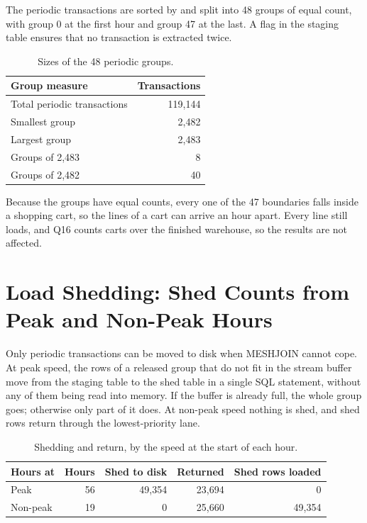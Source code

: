 \documentclass[11pt,a4paper]{article}
\newcommand{\code}[1]{\texttt{\detokenize{#1}}}
\begin{document}
The periodic transactions are sorted by \code{event_time} and split into 48 groups of equal count, with group 0 at the first hour and group 47 at the last. A \code{released} flag in the staging table ensures that no transaction is extracted twice.

\begin{table}[ht]
  \centering
  \caption{Sizes of the 48 periodic groups.}
  \begin{tabular}{lr}
    \toprule
    Group measure & Transactions \\
    \midrule
    Total periodic transactions & 119,144 \\
    Smallest group & 2,482 \\
    Largest group & 2,483 \\
    Groups of 2,483 & 8 \\
    Groups of 2,482 & 40 \\
    \bottomrule
  \end{tabular}
\end{table}

Because the groups have equal counts, every one of the 47 boundaries falls inside a shopping cart, so the lines of a cart can arrive an hour apart. Every line still loads, and Q16 counts carts over the finished warehouse, so the results are not affected.

\section{Load Shedding: Shed Counts from Peak and Non-Peak Hours}

Only periodic transactions can be moved to disk when MESHJOIN cannot cope. At peak speed, the rows of a released group that do not fit in the stream buffer move from the staging table to the shed table in a single SQL statement, without any of them being read into memory. If the buffer is already full, the whole group goes; otherwise only part of it does. At non-peak speed nothing is shed, and shed rows return through the lowest-priority lane.

\begin{table}[ht]\centering
\caption{Shedding and return, by the speed at the start of each hour.}
\begin{tabular}{lrrrr}
\toprule \textbf{Hours at} & \textbf{Hours} & \textbf{Shed to disk} & \textbf{Returned} & \textbf{Shed rows loaded} \\ \midrule
Peak & 56 & 49,354 & 23,694 & 0 \\
Non-peak & 19 & 0 & 25,660 & 49,354 \\
\bottomrule\end{tabular}
\end{table}
\end{document}

